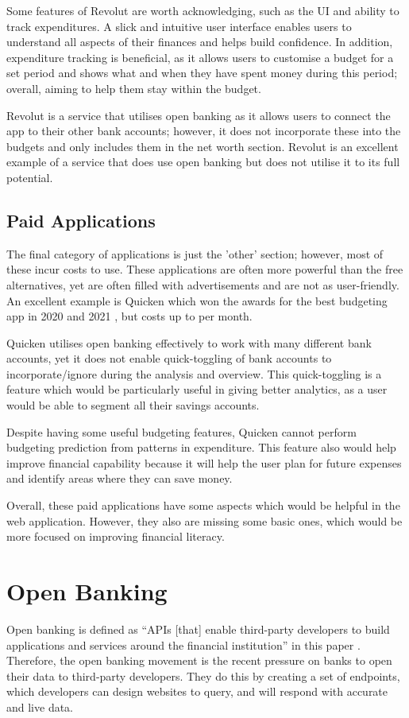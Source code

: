 Some features of Revolut are worth acknowledging, such as the UI and ability to track expenditures. A slick and intuitive user interface enables users to understand all aspects of their finances and helps build confidence. In addition, expenditure tracking is beneficial, as it allows users to customise a budget for a set period and shows what and when they have spent money during this period; overall, aiming to help them stay within the budget.

Revolut is a service that utilises open banking as it allows users to connect the app to their other bank accounts; however, it does not incorporate these into the budgets and only includes them in the net worth section. Revolut is an excellent example of a service that does use open banking but does not utilise it to its full potential.

\subsection{Paid Applications}
\label{sec:paid-applications}
The final category of applications is just the 'other' section; however, most of these incur costs to use. These applications are often more powerful than the free alternatives, yet are often filled with advertisements and are not as user-friendly. An excellent example is Quicken which won the awards for the best budgeting app in 2020 and 2021 \cite{Quicken}, but costs up to  per month.

Quicken utilises open banking effectively to work with many different bank accounts, yet it does not enable quick-toggling of bank accounts to incorporate/ignore during the analysis and overview. This quick-toggling is a feature which would be particularly useful in giving better analytics, as a user would be able to segment all their savings accounts.

Despite having some useful budgeting features, Quicken cannot perform budgeting prediction from patterns in expenditure. This feature also would help improve financial capability because it will help the user plan for future expenses and identify areas where they can save money.

Overall, these paid applications have some aspects which would be helpful in the web application. However, they also are missing some basic ones, which would be more focused on improving financial literacy.

\section{Open Banking}
\label{sec:open-banking}
Open banking is defined as ``APIs [that] enable third-party developers to build applications and services around the financial institution'' in this paper \cite{OpenBankingDefinition}. Therefore, the open banking movement is the recent pressure on banks to open their data to third-party developers. They do this by creating a set of endpoints, which developers can design websites to query, and will respond with accurate and live data.

